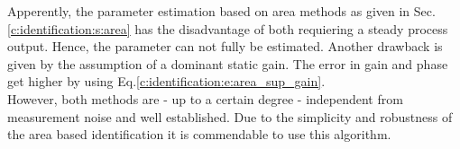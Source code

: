 Apperently, the parameter estimation based on area methods as given in Sec.\ref{c:identification:s:area} has the disadvantage of both requiering a steady process output. Hence, the parameter can not fully be estimated. Another drawback is given by the assumption of a dominant static gain. The error in gain and phase get higher by using Eq.\ref{c:identification:e:area_sup_gain}.\\

However, both methods are - up to a certain degree - independent from measurement noise and well established. Due to the simplicity and robustness of the area based identification it is commendable to use this algorithm. 
